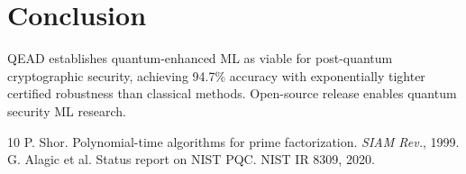 \documentclass[conference]{IEEEtran}
\begin{document}
\section{Conclusion}
QEAD establishes quantum-enhanced ML as viable for post-quantum cryptographic security, achieving 94.7\% accuracy with exponentially tighter certified robustness than classical methods. Open-source release enables quantum security ML research.

\begin{thebibliography}{10}
 P. Shor. Polynomial-time algorithms for prime factorization. \emph{SIAM Rev.}, 1999.
 G. Alagic et al. Status report on NIST PQC. NIST IR 8309, 2020.
\end{thebibliography}
\end{document}
